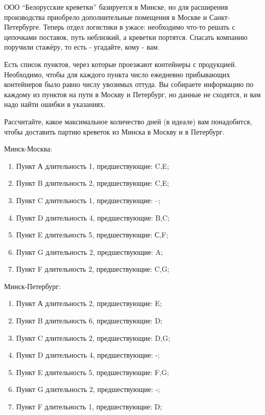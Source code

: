 \question
ООО “Белорусские креветки” базируется в Минске, но для расширения производства приобрело дополнительные помещения в Москве и Санкт-Петербурге. Теперь отдел логистики в ужасе: необходимо что-то решать с цепочками поставок, путь неблизкий, а креветки портятся. Спасать компанию поручили стажёру, то есть - угадайте, кому - вам.

Есть список пунктов, через которые проезжают контейнеры с продукцией. Необходимо, чтобы для каждого пункта число ежедневно прибывающих контейнеров было равно числу увозимых оттуда. Вы собираете информацию по каждому из пунктов на пути в Москву и Петербург, но данные не сходятся, и вам надо найти ошибки в указаниях.

Рассчитайте, какое максимальное количество дней (в идеале) вам понадобится, чтобы доставить партию креветок из Минска в Москву и в Петербург.


Минск-Москва:
\begin{enumerate}
\item Пункт А длительность 1, предшествующие: C,E;
\item Пункт B длительность 2, предшествующие: C,E;
\item Пункт C длительность 1, предшествующие: –;
\item Пункт D длительность 4, предшествующие: B,C;
\item Пункт E длительность 5, предшествующие: С,F;
\item Пункт G длительность 2, предшествующие: A;
\item Пункт F длительность 2, предшествующие: C,G;
\end{enumerate}
Минск-Петербург:
\begin{enumerate}
\item Пункт А длительность 2, предшествующие: E;
\item Пункт B длительность 6, предшествующие: D;
\item Пункт C длительность 2, предшествующие: D,G;
\item Пункт D длительность 4, предшествующие: -;
\item Пункт E длительность 5, предшествующие: F,G;
\item Пункт G длительность 2, предшествующие: -;
\item Пункт F длительность 1, предшествующие: D;
\end{enumerate}
